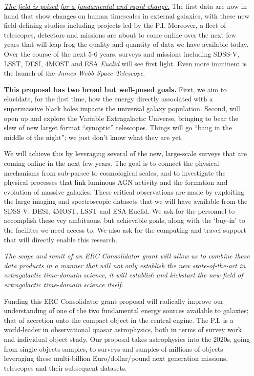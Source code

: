 \documentclass[oneside, a4paper, onecolumn, 11pt]{article}
\begin{document}
\smallskip
\smallskip
\noindent
\underline{{\it The field is poised for a fundamental and rapid change.}} The first data
are now in hand that show changes on human timescales in external
galaxies, with these new field-defining studies including projects led
by the P.I.  Moreover, a fleet of telescopes, detectors and missions
are about to come online over the next few years that will 
leap-frog the quality and quantity of data we have available
today. Over the course of the next 5-6 years, surveys and missions including
SDSS-V, LSST, DESI, 4MOST and ESA {\it Euclid} will see first light. Even more
imminent is the launch of the {\it James Webb Space Telescope}. 


\smallskip
\smallskip
\noindent
{\bf This proposal has two broad but well-posed goals.}
First, we aim to elucidate, for the first time, how the energy directly associated with a 
supermassive black holes impacts the universal galaxy population.  
Second, will open up and explore the Variable Extragalactic Universe, bringing to bear 
the slew of new larget format ``synoptic'' telescopes. 
Things will go ``bang in the middle of the night''; we just don't know what 
they are yet. 
%

\smallskip
\smallskip
\noindent
We will achieve this by leveraging several of the new, large-scale
surveys that are coming online in the next few years.  
The goal is to connect the physical mechanisms from sub-parsec to
cosmological scales, and to investigate the physical processes that
link luminous AGN activity and the formation and evolution of massive
galaxies. These critical observations are made by exploiting the large
imaging and spectroscopic datasets that we will have available from
the SDSS-V, DESI, 4MOST, LSST and ESA Euclid.
We ask for the personnel to accomplish these vey ambituous, but
achievable goals, along with the `buy-in' to the facilites we need
access to.  We also ask for the computing and travel support that will
directly enable this research.

\smallskip
\smallskip
\noindent
{\it The scope and
remit of an ERC Consolidator grant will allow us to combine these data
products in a manner that will not only establish the new
state-of-the-art in extragalactic time-domain science, it will
establish and kickstart the new field of extragalactic  time-domain 
science itself.}

\smallskip
\smallskip
\noindent
Funding this ERC Consolidator grant proposal will radically improve our understanding of 
one of the two fundamental energy sources available to galaxies; that of accretion 
onto the compact object in the central engine. 
The P.I. is a world-leader in observational quasar astrophysics, both in terms of 
survey work and individual object study. 
Our proposal takes astrophysics into the 2020s, going from single objects samples, 
to surveys and samples of millions of objects leveraging these multi-billion Euro/dollar/pound  
next generation missions, telescopes and their subsequent datasets. 
\end{document}
